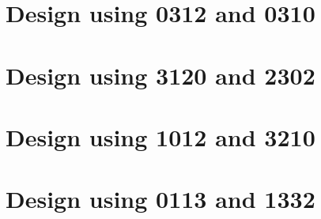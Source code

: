  \begin{center}




 \end{center}



\section{Design using 0312 and 0310}


 \begin{center}




 \end{center}



\section{Design using 3120 and 2302}


 \begin{center}




 \end{center}



\section{Design using 1012 and 3210}


 \begin{center}




 \end{center}



\section{Design using 0113 and 1332}


 \begin{center}




 \end{center}



